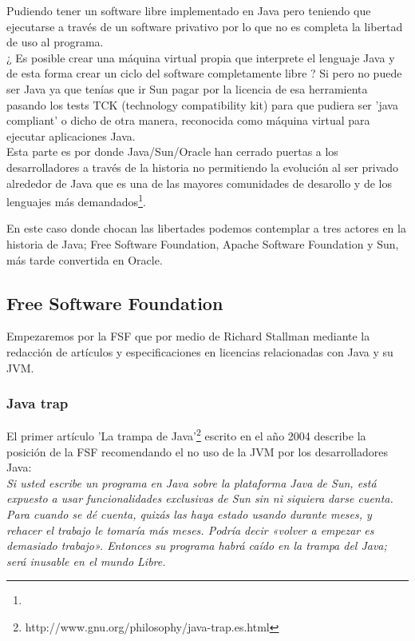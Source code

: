 \documentclass[11pt]{scrartcl}
\begin{document}
Pudiendo tener un software libre implementado en Java pero teniendo que ejecutarse a través de un software privativo por lo que no es completa la libertad de uso al programa.\\
¿ Es posible crear una máquina virtual propia que interprete el lenguaje Java y de esta forma crear un ciclo del software completamente libre ? Si pero no puede ser Java ya que tenías que ir Sun pagar por la licencia de esa herramienta pasando los tests TCK (technology compatibility kit) para que pudiera ser 'java compliant' o dicho de otra manera, reconocida como máquina virtual para ejecutar aplicaciones Java.\\
Esta parte es por donde Java/Sun/Oracle han cerrado puertas a los desarrolladores a través de la historia no permitiendo la evolución al ser privado alrededor de Java que es una de las mayores comunidades de desarollo y de los lenguajes más demandados\footnote{}.%

En este caso donde chocan las libertades podemos contemplar a tres actores en la historia de Java; Free Software Foundation, Apache Software Foundation y Sun, más tarde convertida en Oracle.

\subsection{Free Software Foundation}

Empezaremos por la FSF que por medio de Richard Stallman mediante la redacción de artículos y especificaciones en licencias relacionadas con Java y su JVM.

\subsubsection{Java trap}

El primer artículo 'La trampa de Java'\footnote{http://www.gnu.org/philosophy/java-trap.es.html} escrito en el año 2004 describe la posición de la FSF recomendando el no uso de la JVM por los desarrolladores Java:\\

    \emph{Si usted escribe un programa en Java sobre la plataforma Java de Sun, está expuesto a usar funcionalidades exclusivas de Sun sin ni siquiera darse cuenta. Para cuando se dé cuenta, quizás las haya estado usando durante meses, y rehacer el trabajo le tomaría más meses. Podría decir «volver a empezar es demasiado trabajo». Entonces su programa habrá caído en la trampa del Java; será inusable en el mundo Libre.}\\
    
\end{document}
